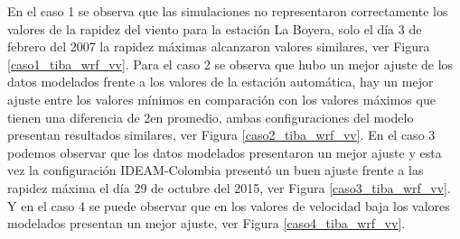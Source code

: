 En el caso 1 se observa que las simulaciones no representaron correctamente los valores de la rapidez del viento para la estación La Boyera, solo el día 3 de febrero del 2007 la rapidez máximas alcanzaron valores similares, ver Figura \ref{caso1_tiba_wrf_vv}. Para el caso 2 se observa que hubo un mejor ajuste de los datos modelados frente a los valores de la estación automática, hay un mejor ajuste entre los valores mínimos en comparación con los valores máximos que tienen una diferencia de 2\celsius en promedio, ambas configuraciones del modelo presentan resultados similares, ver Figura \ref{caso2_tiba_wrf_vv}. En el caso 3 podemos observar que los datos modelados presentaron un mejor ajuste y esta vez la configuración IDEAM-Colombia presentó un buen ajuste frente a las rapidez máxima el día 29 de octubre del 2015, ver Figura \ref{caso3_tiba_wrf_vv}. Y en el caso 4 se puede observar que en los valores de velocidad baja los valores modelados presentan un mejor ajuste, ver Figura \ref{caso4_tiba_wrf_vv}.\\


